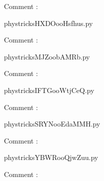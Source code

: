     Comment : 

    \clearpage
    


    \newcommand{\CaptionFigHXDOooHsfhus}{<+Type your caption here+>}
    \begin{center}
        
    \end{center}
    phystricksHXDOooHsfhus.py

    Comment : 

    \clearpage
    


    \newcommand{\CaptionFigMJZoobAMRb}{<+Type your caption here+>}
    \begin{center}
        
    \end{center}
    phystricksMJZoobAMRb.py

    Comment : 

    \clearpage
    


    \newcommand{\CaptionFigIFTGooWtjCeQ}{<+Type your caption here+>}
    \begin{center}
        
    \end{center}
    phystricksIFTGooWtjCeQ.py

    Comment : 

    \clearpage
    


    \newcommand{\CaptionFigSRYNooEdaMMH}{<+Type your caption here+>}
    \begin{center}
        
    \end{center}
    phystricksSRYNooEdaMMH.py

    Comment : 

    \clearpage
    


    \newcommand{\CaptionFigYBWRooQjwZuu}{<+Type your caption here+>}
    \begin{center}
        
    \end{center}
    phystricksYBWRooQjwZuu.py

    Comment : 

    \clearpage
    


